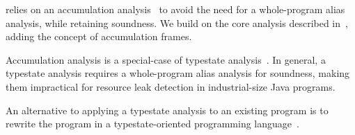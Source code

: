 \tool relies on an accumulation
analysis~\cite{kellogg20verifying,FahndrichLeino03} to avoid the need
for a whole-program alias analysis, while retaining soundness.  We
build on the core analysis described in~\cite{kellogg20verifying},
adding the concept of accumulation frames.

Accumulation analysis is a special-case of typestate analysis~\cite{StromY86}.
In general, a typestate analysis requires a whole-program alias analysis
for soundness, making them impractical for resource leak detection
in industrial-size Java programs. 

An alternative to applying a typestate analysis to an existing program
is to rewrite the program in a typestate-oriented programming
language~\cite{AldrichSSS2009}. 

